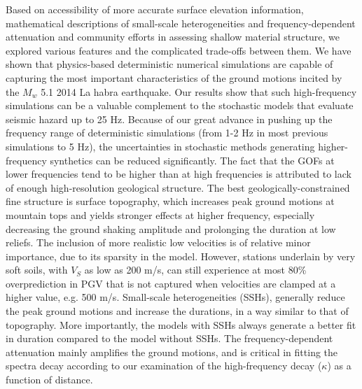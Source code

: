 

Based on accessibility of more accurate surface elevation information, mathematical descriptions of small-scale heterogeneities and frequency-dependent attenuation and community efforts in assessing shallow material structure, we explored various features and the complicated trade-offs between them. We have shown that physics-based deterministic numerical simulations are capable of capturing the most important characteristics of the ground motions incited by the $M_w$ 5.1 2014 La habra earthquake. Our results show that such high-frequency simulations can be  a valuable complement to the stochastic models that evaluate seismic hazard up to 25 Hz. Because of our great advance in pushing up the frequency range of deterministic simulations (from 1-2 Hz in most previous simulations to 5 Hz), the uncertainties in stochastic methods generating higher-frequency synthetics can be reduced significantly.
The fact that the GOFs at lower frequencies tend to be higher than at high frequencies is attributed to lack of enough high-resolution geological structure. The best geologically-constrained fine structure is surface topography, which increases peak ground motions at mountain tops and yields stronger effects at higher frequency, especially decreasing the ground shaking amplitude and prolonging the duration at low reliefs. The inclusion of more realistic low velocities is of relative minor importance, due to its sparsity in the model. However, stations underlain by very soft soils, with $V_S$ as low as 200 m/s, can still experience at most 80\% overprediction in PGV that is not captured when velocities are clamped at a higher value, e.g. 500 m/s. Small-scale heterogeneities (SSHs), generally reduce the peak ground motions and increase the durations, in a way similar to that of topography. More importantly, the models with SSHs always generate a better fit in duration compared to the model without SSHs. The frequency-dependent attenuation mainly amplifies the ground motions, and is critical in fitting the spectra decay according to our examination of the high-frequency decay ($\kappa$) as a function of distance.

